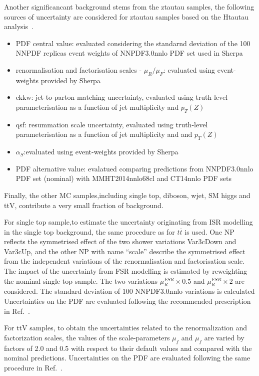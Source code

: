 Another significancant background stems from the ztautau samples, the following sources of uncertainty are considered for ztautau samples based on the Htautau analysis~\cite{Htautau}.
\begin{itemize}
	\item PDF central value: evaluated considering the standarnd deviation of the 100 NNPDF replicas event weights of NNPDF3.0nnlo PDF set used in Sherpa
	\item renormalisation and factorisation scales - $\mu_{R}/\mu_{F}$: evaluated using event-weights provided by Sherpa
	\item ckkw: jet-to-parton matching uncertainty, evaluated using truth-level parameterisation as a function of jet multiplicity and $p_{T}(Z)$
	\item qsf: resummation scale uncertainty, evaluated using truth-level parameterisation as a function of jet multiplicity and and $p_{T}(Z)$
	\item $\alpha_{S}$:evaluated using event-weights provided by Sherpa
	\item PDF alternative value: evalatued comparing predictions from NNPDF3.0nnlo PDF set (nominal) with MMHT2014nnlo68cl and CT14nnlo PDF sets
\end{itemize}

Finally, the other MC samples,including single top, diboson, wjet, SM higgs and ttV, contribute a very small fraction of background. 

For single top sample,to estimate the uncertainty originating from ISR modelling in the single top background, the same procedure as for $t\bar{t}$ is used. One NP reflects the symmetrised effect of the two shower variations Var3cDown and Var3cUp, and the other NP with name ``scale'' describe the symmetrised effect from the independent variations of the renormalisation and factorisation scale. The impact of the uncertainty from FSR modelling is estimated by reweighting the nominal single top sample. The two variations $\mu^{FSR}_{R} \times 0.5$ and $\mu^{FSR}_{R} \times 2$ are considered.  The standard deviation of 100 NNPDF3.0nnlo variations is calculated Uncertainties on the PDF are evaluated following the recommended prescription in Ref.~\cite{ttRun2}.

For ttV samples, to obtain the uncertainties related to the renormalization and factorization scales, the values of the scale-parameters $\mu_{f}$ and $\mu_{f}$ are varied by factors of 2.0 and 0.5 with respect to their default values and compared with the nominal predictions. Uncertainties on the PDF are evaluated following the same procedure in Ref.~\cite{ttZRun2}.

